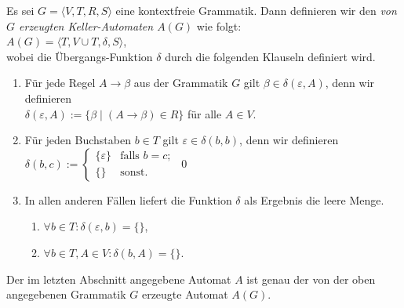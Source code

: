 \begin{Definition}[$A(G)$]
  Es sei $G = \langle V, T, R, S \rangle$ eine kontextfreie Grammatik.  Dann definieren
  wir den \emph{von $G$ erzeugten Keller-Automaten $A(G)$} wie folgt:
  \\[0.2cm]
  \hspace*{1.3cm}
  $A(G) = \langle T, V \cup T, \delta, S \rangle$,
  \\[0.2cm]
  wobei die \"Ubergangs-Funktion $\delta$ durch die folgenden Klauseln definiert wird.
  \begin{enumerate}
  \item F\"ur jede Regel $A \rightarrow \beta$ aus der Grammatik $G$ gilt $\beta \in \delta(\varepsilon, A)$,
        denn wir definieren
        \\[0.2cm]
        \hspace*{1.3cm}
        $\delta(\varepsilon, A) := \bigl\{ \beta \mid (A \rightarrow \beta) \in R \bigr\}$
        \quad f\"ur alle $A \in V$.
  \item F\"ur jeden Buchstaben $b \in T$ gilt $\varepsilon \in \delta(b,b)$, denn wir definieren
        \\[0.2cm]
        \hspace*{1.3cm}
        $\delta(b,c) := \left\{
        \begin{array}{ll}
          \{ \varepsilon \} & \mbox{falls $b = c$;} \\
          \{\}              & \mbox{sonst.}
        \end{array}\right.
        $
        \qed
  \item In allen anderen F\"allen liefert die Funktion $\delta$ als Ergebnis die leere Menge.
        \begin{enumerate}
        \item $\forall b \in T: \delta(\varepsilon, b) = \{\}$,
        \item $\forall b \in T, A \in V: \delta(b, A) = \{\}$.
        \end{enumerate}
  \end{enumerate}
\end{Definition}

\remark
Der im letzten Abschnitt angegebene Automat $A$ ist genau der von der oben angegebenen
Grammatik $G$ erzeugte Automat $A(G)$.
\vspace*{0.3cm}

